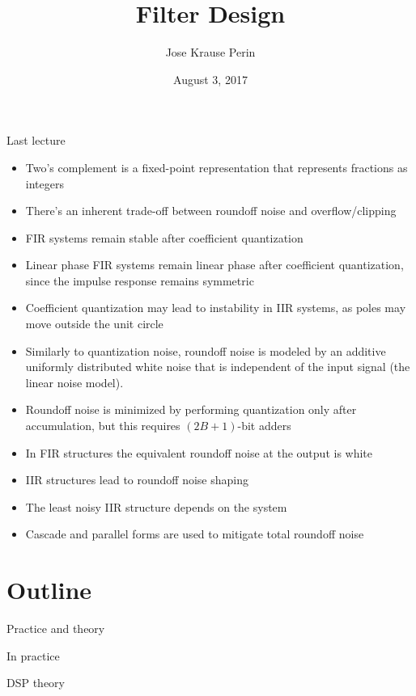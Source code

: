 \documentclass[10pt]{beamer}
\title[EE 264]{Filter Design}
\author{Jose Krause Perin}
\institute{Stanford University}
\date{August 3, 2017}
\begin{document}
\begin{frame}
  \titlepage
\end{frame}

%
\begin{frame}{Last lecture}
\begin{itemize}
	\item Two's complement is a fixed-point representation that represents fractions as integers
	\item There's an inherent trade-off between roundoff noise and overflow/clipping
	\item FIR systems remain stable after coefficient quantization
	\item Linear phase FIR systems remain linear phase after coefficient quantization, since the impulse response remains symmetric
	\item Coefficient quantization may lead to instability in IIR systems, as poles may move outside the unit circle
	\item Similarly to quantization noise, roundoff noise is modeled by an additive uniformly distributed white noise that is independent of the input signal (the linear noise model).
	\item Roundoff noise is minimized by performing quantization only after accumulation, but this requires $(2B+1)$-bit adders
	\item In FIR structures the equivalent roundoff noise at the output is white
	\item IIR structures lead to roundoff noise shaping
	\item The least noisy IIR structure depends on the system
	\item Cascade and parallel forms are used to mitigate total roundoff noise
\end{itemize}
\end{frame}

%
\section{Outline}

\begin{frame}{Practice and theory}
\begin{block}{In practice}
	\vspace{-0.5cm}
	\begin{center}
		\resizebox{\linewidth}{!}{}
	\end{center}
\end{block}

\begin{block}{DSP theory}
	\vspace{-0.5cm}
	\begin{center}
		\def\Heff{1}
		\resizebox{\linewidth}{!}{}
	\end{center}
\end{block}

\end{frame}
\end{document}
